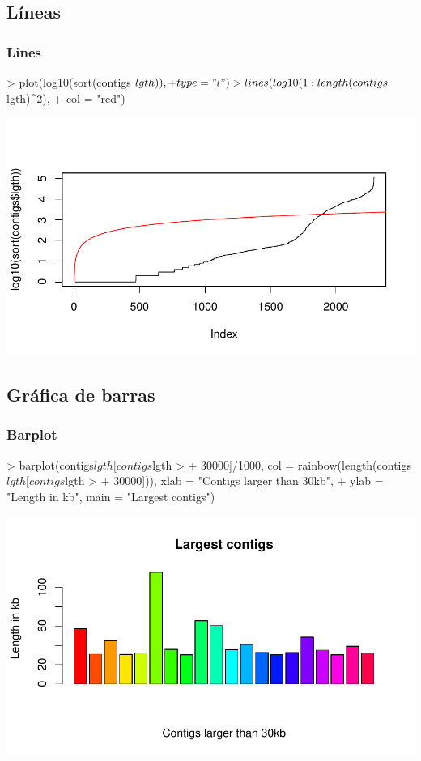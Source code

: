 \subsection{Líneas}

\begin{frame}
  \frametitle{Lines}
  \scriptsize 
\begin{Schunk}
\begin{Sinput}
> plot(log10(sort(contigs$lgth)), 
+     type = "l")
> lines(log10(1:length(contigs$lgth)^2), 
+     col = "red")
\end{Sinput}
\end{Schunk}
\includegraphics{plots/figura-025}
\normalsize
\end{frame}

\subsection{Gráfica de barras}

\begin{frame}
  \frametitle{Barplot}
  \scriptsize 
\begin{Schunk}
\begin{Sinput}
> barplot(contigs$lgth[contigs$lgth > 
+     30000]/1000, col = rainbow(length(contigs$lgth[contigs$lgth > 
+     30000])), xlab = "Contigs larger than 30kb", 
+     ylab = "Length in kb", main = "Largest contigs")
\end{Sinput}
\end{Schunk}
\includegraphics{plots/figura-026}
\normalsize
\end{frame}

